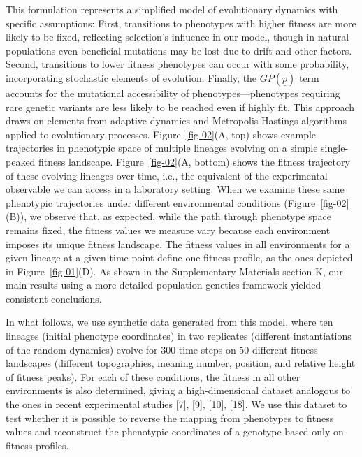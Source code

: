\documentclass[
]{scrartcl}
\begin{document}
\begin{refsegment}
This formulation represents a simplified model of evolutionary dynamics
with specific assumptions: First, transitions to phenotypes with higher
fitness are more likely to be fixed, reflecting selection's influence in
our model, though in natural populations even beneficial mutations may
be lost due to drift and other factors. Second, transitions to lower
fitness phenotypes can occur with some probability, incorporating
stochastic elements of evolution. Finally, the \(GP(\underline{p})\)
term accounts for the mutational accessibility of
phenotypes---phenotypes requiring rare genetic variants are less likely
to be reached even if highly fit. This approach draws on elements from
adaptive dynamics and Metropolis-Hastings algorithms applied to
evolutionary processes. Figure~\ref{fig-02}(A, top) shows example
trajectories in phenotypic space of multiple lineages evolving on a
simple single-peaked fitness landscape. Figure~\ref{fig-02}(A, bottom)
shows the fitness trajectory of these evolving lineages over time, i.e.,
the equivalent of the experimental observable we can access in a
laboratory setting. When we examine these same phenotypic trajectories
under different environmental conditions (Figure~\ref{fig-02}(B)), we
observe that, as expected, while the path through phenotype space
remains fixed, the fitness values we measure vary because each
environment imposes its unique fitness landscape. The fitness values in
all environments for a given lineage at a given time point define one
fitness profile, as the ones depicted in Figure~\ref{fig-01}(D). As
shown in the Supplementary Materials section K, our main results using a
more detailed population genetics framework yielded consistent
conclusions.

In what follows, we use synthetic data generated from this model, where
ten lineages (initial phenotype coordinates) in two replicates
(different instantiations of the random dynamics) evolve for 300 time
steps on 50 different fitness landscapes (different topographies,
meaning number, position, and relative height of fitness peaks). For
each of these conditions, the fitness in all other environments is also
determined, giving a high-dimensional dataset analogous to the ones in
recent experimental studies {[}7{]}, {[}9{]}, {[}10{]}, {[}18{]}. We use
this dataset to test whether it is possible to reverse the mapping from
phenotypes to fitness values and reconstruct the phenotypic coordinates
of a genotype based only on fitness profiles.

\begin{figure}


\end{figure}
\end{refsegment}
\end{document}
